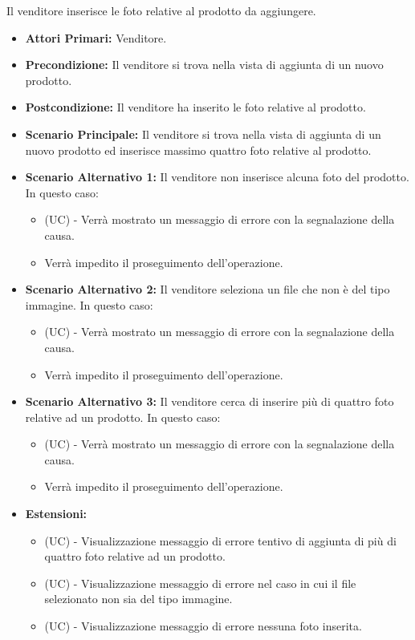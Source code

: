 Il venditore inserisce le foto relative al prodotto da aggiungere.
\begin{itemize}
    \item \textbf{Attori Primari:} Venditore.
    \item \textbf{Precondizione:} Il venditore si trova nella vista di aggiunta di un nuovo prodotto.
    \item \textbf{Postcondizione:} Il venditore ha inserito le foto relative al prodotto.
    \item \textbf{Scenario Principale:} Il venditore si trova nella vista di aggiunta di un nuovo prodotto ed inserisce massimo quattro foto relative al prodotto.
    \item \textbf{Scenario Alternativo 1:} Il venditore non inserisce alcuna foto del prodotto. In questo caso:
    \begin{itemize}
        \item (UC) - Verrà mostrato un messaggio di errore con la segnalazione della causa.
        \item Verrà impedito il proseguimento dell'operazione.
    \end{itemize}
    \item \textbf{Scenario Alternativo 2:} Il venditore seleziona un file che non è del tipo immagine. In questo caso:
    \begin{itemize}
        \item (UC) - Verrà mostrato un messaggio di errore con la segnalazione della causa.
        \item Verrà impedito il proseguimento dell'operazione.
    \end{itemize}
    \item \textbf{Scenario Alternativo 3:} Il venditore cerca di inserire più di quattro foto relative ad un prodotto. In questo caso:
    \begin{itemize}
        \item (UC) - Verrà mostrato un messaggio di errore con la segnalazione della causa.
        \item Verrà impedito il proseguimento dell'operazione.
    \end{itemize}
    \item \textbf{Estensioni:}
    \begin{itemize}
        \item (UC) - Visualizzazione messaggio di errore tentivo di aggiunta di più di quattro foto relative ad un prodotto.
        \item (UC) - Visualizzazione messaggio di errore nel caso in cui il file selezionato non sia del tipo immagine.
        \item (UC) - Visualizzazione messaggio di errore nessuna foto inserita.
    \end{itemize}
\end{itemize}

